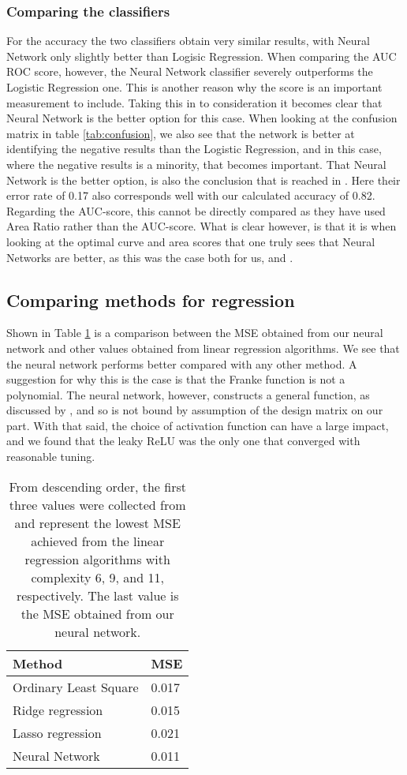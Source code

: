 \subsubsection{Comparing the classifiers}
For the accuracy the two classifiers obtain very similar results, with Neural Network only slightly better than Logisic Regression. When comparing the AUC ROC score, however, the Neural Network classifier severely outperforms the Logistic Regression one. This is another reason why the score is an important measurement to include. Taking this in to consideration it becomes clear that Neural Network is the better option for this case. When looking at the confusion matrix in table \ref{tab:confusion}, we also see that the network is better at identifying the negative results than the Logistic Regression, and in this case, where the negative results is a minority, that becomes important. That Neural Network is the better option, is also the conclusion that is reached in \cite{yeh2009UCI}. Here their error rate of 0.17 also corresponds well with our calculated accuracy of 0.82. Regarding the AUC-score, this cannot be directly compared as they have used Area Ratio rather than the AUC-score. What is clear however, is that it is when looking at the optimal curve and area scores that one truly sees that Neural Networks are better, as this was the case both for us, and \cite{yeh2009UCI}.

\subsection{Comparing methods for regression}
Shown in Table \ref{tab:mse} is a comparison between the MSE obtained from our neural network and other values obtained from linear regression algorithms. We see that the neural network performs better compared with any other method. A suggestion for why this is the case is that the Franke function is not a polynomial. The neural network, however, constructs a general function, as discussed by \citet{Nielsen}, and so is not bound by assumption of the design matrix on our part. With that said, the choice of activation function can have a large impact, and we found that the leaky ReLU was the only one that converged with reasonable tuning.
\begin{table}[htbp]
	\renewcommand{\arraystretch}{1.2}
	\centering
	\caption{From descending order, the first three values were collected from \citet{prosjekt1} and represent the lowest MSE achieved from the linear regression algorithms with complexity 6, 9, and 11, respectively. The last value is the MSE obtained from our neural network.}
	\begin{tabular}{l l}
		\toprule
		Method & MSE \\
		\midrule
		Ordinary Least Square & 0.017 \\
		Ridge regression & 0.015\\
		Lasso regression & 0.021\\
		Neural Network & 0.011\\
		\bottomrule
	\end{tabular}
	\label{tab:mse}
\end{table}
